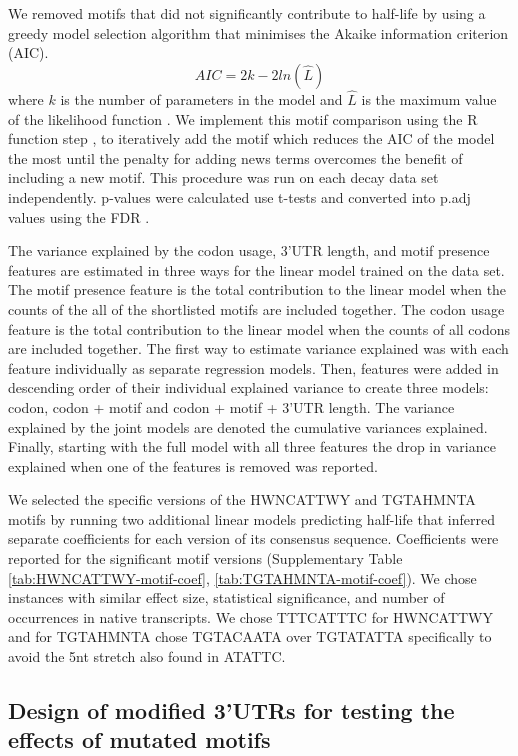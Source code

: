\documentclass[../main.tex]{subfiles}
\begin{document}
We removed motifs that did not significantly contribute to half-life by using a greedy model selection algorithm that minimises the Akaike information criterion (AIC).
\[AIC = 2k - 2ln(\hat{L})\]
where \(k\) is the number of parameters in the model and \(\hat L\) is the maximum value of the likelihood function \parencite{Akaike1998}.
We implement this motif comparison using the R function step \parencite{Rstats,Ripley2002},
to iteratively add the motif which reduces the AIC of the model the most until the penalty for adding news terms overcomes the benefit of including a new motif.
This procedure was run on each decay data set independently.
p-values were calculated use t-tests and converted into p.adj values using the FDR \parencite{Benjamini1995}.

The variance explained by the codon usage, 3’UTR length, and motif presence features are estimated in three ways for the linear model trained on the \parencite{Chan2018} data set.
The motif presence feature is the total contribution to the linear model when the counts of the all of the shortlisted motifs are included together.
The codon usage feature is the total contribution to the linear model when the counts of all codons are included together.
The first way to estimate variance explained was with each feature individually as separate regression models.
Then, features were added in descending order of their individual explained variance to create three models: codon, codon + motif and codon + motif + 3'UTR length.
The variance explained by the joint models are denoted the cumulative variances explained.
Finally, starting with the full model with all three features the drop in variance explained when one of the features is removed was reported.

We selected the specific versions of the HWNCATTWY and TGTAHMNTA motifs by running two additional linear models predicting half-life that inferred separate coefficients for each version of its consensus sequence.
Coefficients were reported for the significant motif versions (Supplementary Table \ref{tab:HWNCATTWY-motif-coef}, \ref{tab:TGTAHMNTA-motif-coef}).
We chose instances with similar effect size, statistical significance, and number of occurrences in native transcripts.
We chose TTTCATTTC for HWNCATTWY and for TGTAHMNTA chose TGTACAATA over TGTATATTA specifically to avoid the 5nt stretch also found in ATATTC.

\subsection{Design of modified 3'UTRs for testing the effects of mutated motifs}
\end{document}

